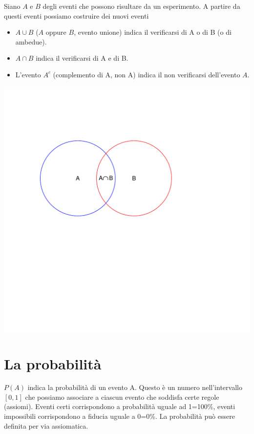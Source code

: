 \documentclass[onecolumn,12pt]{book}\usepackage[]{graphicx}\usepackage[]{color}
\makeatletter
\def\maxwidth{ %
  \ifdim\Gin@nat@width>\linewidth
    \linewidth
  \else
    \Gin@nat@width
  \fi
}
\newenvironment{knitrout}{}{} %
\makeatother
\begin{document}
Siano $A$ e  $B$ degli eventi che possono risultare da un esperimento. A partire da questi eventi possiamo costruire dei nuovi eventi
\begin{itemize}
\item $A\cup B$ ($A$ oppure $B$, evento unione) indica il verificarsi di A o di B (o di ambedue).
\item $A \cap  B$  indica il verificarsi di A e di  B.
\item L'evento  $A^c$ (complemento di A, non A)   indica il non verificarsi dell'evento $A$.   
\end{itemize}
\begin{knitrout}
\color{fgcolor}
\includegraphics[width=\maxwidth]{figure/unnamed-chunk-3-1} 

\end{knitrout}


\section{La probabilità}

$P(A)$ indica la probabilità di un evento A. Questo è un numero nell'intervallo $[0,1]$ che possiamo associare a ciascun evento che soddisfa certe regole (assiomi).
Eventi certi corrispondono a probabilità uguale ad 1=100\%, eventi impossibili corrispondono a fiducia uguale a 0=0\%.
La probabilità può essere definita per via assiomatica. 
\end{document}
